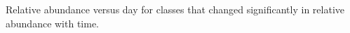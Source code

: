 Relative abundance versus day for classes that changed significantly in relative abundance with time.
